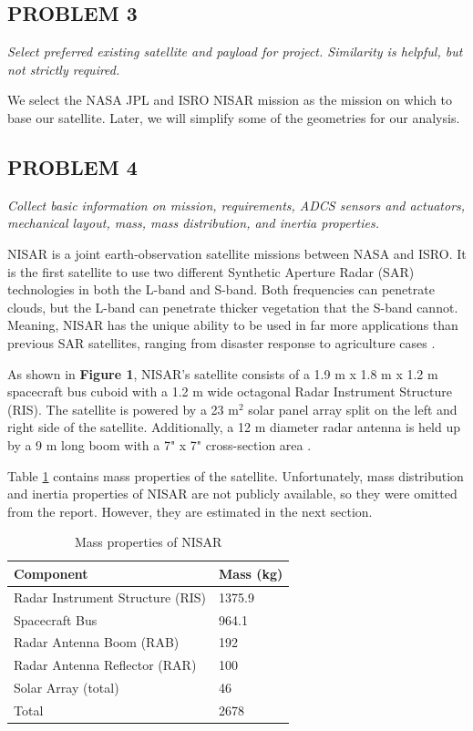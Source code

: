 \subsection{PROBLEM 3}
\textit{Select preferred existing satellite and payload for project. Similarity is helpful, but not strictly required.}

We select the NASA JPL and ISRO NISAR mission as the mission on which to base our satellite. Later, we will simplify some of the geometries for our analysis.

\subsection{PROBLEM 4}
\textit{Collect basic information on mission, requirements, ADCS sensors and actuators, mechanical layout, mass, mass distribution, and inertia properties.}

NISAR is a joint earth-observation satellite missions between NASA and ISRO. It is the first satellite to use two different Synthetic Aperture Radar (SAR) technologies in both the L-band and S-band. Both frequencies can penetrate clouds, but the L-band can penetrate thicker vegetation that the S-band cannot. Meaning, NISAR has the unique ability to be used in far more applications than previous SAR satellites, ranging from disaster response to agriculture cases \cite{NisarApps}.



As shown in \textbf{Figure 1}, NISAR's satellite consists of a 1.9 m x 1.8 m x 1.2 m spacecraft bus cuboid with a 1.2 m wide octagonal Radar Instrument Structure (RIS). The satellite is powered by a 23 m$^2$ solar panel array split on the left and right side of the satellite. Additionally, a 12 m diameter radar antenna is held up by a 9 m long boom with a 7" x 7" cross-section area \cite{NisarMission}.

Table \ref{NisarMassProps} contains mass properties of the satellite. Unfortunately, mass distribution and inertia properties of NISAR are not publicly available, so they were omitted from the report. However, they are estimated in the next section.

\begin{table}
\caption{Mass properties of NISAR}
\centering
\begin{tabular}{|l|l|}
\hline
\textbf{Component}               & \textbf{Mass (kg)} \\ \hline
Radar Instrument Structure (RIS) & 1375.9             \\ \hline
Spacecraft Bus                   & 964.1              \\ \hline
Radar Antenna Boom (RAB)         & 192                \\ \hline
Radar Antenna Reflector (RAR)    & 100                \\ \hline
Solar Array (total)              & 46                 \\ \hline
Total                            & 2678               \\ \hline
\end{tabular}
\label{NisarMassProps}
\end{table}

